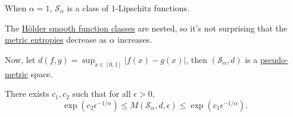 \begin{note}
	When \(\alpha = 1\), \(\mathcal{S} _\alpha \) is a class of \(1\)-Lipschitz functions.
\end{note}

\begin{remark}
	The \hyperref[def:Holder-smooth-function-class]{Hölder smooth function classes} are nested, so it's not surprising that the \hyperref[def:metric-entropy]{metric entropies} decrease as \(\alpha \) increases.
\end{remark}

Now, let \(d(f, g) = \sup _{x\in [0, 1]} \vert f(x) - g(x) \vert \), then \((\mathcal{S} _\alpha , d)\) is a \hyperref[def:pseudo-metric]{pseudo-metric} space.

\begin{theorem}\label{thm:metric-entropy}
	There exists \(c_1, c_2\) such that for all \(\epsilon > 0\),
	\[
		\exp \left( c_2 \epsilon ^{-1 / \alpha } \right)
		\leq M(\mathcal{S} _\alpha , d, \epsilon )
		\leq \exp \left( c_1 \epsilon ^{-1 / \alpha } \right) .
	\]
\end{theorem}
